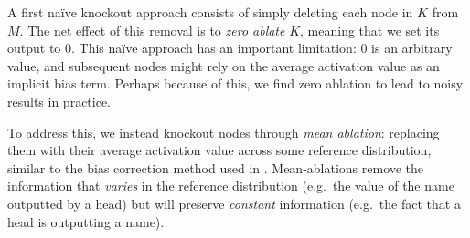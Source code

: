 A first naïve knockout approach consists of simply deleting each node in $K$ from $M$. %
The net effect of this removal is to \textit{zero ablate} $K$, meaning that we set its output to 0. This naïve approach has an important limitation: 0 is an arbitrary value, and subsequent nodes might rely on the average activation value as an implicit bias term. Perhaps because of this, we find zero ablation to lead to noisy results in practice. %

To address this, we instead knockout nodes through \textit{mean ablation}: replacing them with their average activation value across some reference distribution, similar to the bias correction method used in \citet{meca_interp_grokking}.  Mean-ablations remove the information that \textit{varies} in the reference distribution (e.g.~the value of the name outputted by a head) but will preserve \textit{constant} information (e.g.~the fact that a head is outputting a name). %



